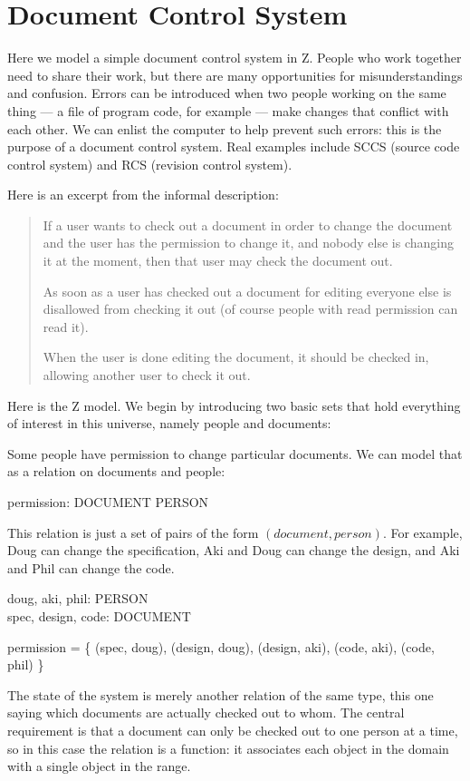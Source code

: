 \documentclass{article}
\begin{document}
\section*{Document Control System}

Here we model a simple document control system in Z.
People who work together need to share their work, but there are many
opportunities for misunderstandings and confusion.  Errors can be
introduced when two people working on the same thing --- a file of
program code, for example --- make changes that conflict with each
other.  We can enlist the computer to help prevent such errors: this
is the purpose of a document control system.  Real examples include
SCCS (source code control system) and RCS (revision control
system).

Here is an excerpt from the informal description:

\begin{quote}
    If a user wants to check out a document in order to change
    the document and the user  has the permission to change it, 
    and nobody else is changing it at the moment, then that user
    may check the document out.

    As soon as a user has checked out a document for editing
    everyone else is disallowed from checking it out (of course people with
    read permission can read it).

    When the user is done editing the document, it should be
    checked in, allowing another user to check it out.
\end{quote}

Here is the Z model.  We begin by introducing two basic sets that
hold everything of interest in this universe, namely people and
documents:

\begin{zed}  \end{zed}
Some people have permission to change particular documents.  We can model
that as a relation on documents and people:

\begin{axdef}
	permission: DOCUMENT \rel PERSON
\end{axdef}
This relation is just a set of pairs of the form $(document, person)$.
For example, Doug can change the specification, Aki and Doug can
change the design, and Aki and Phil can change the code.

\begin{axdef}
	doug, aki, phil: PERSON \\
	spec, design, code: DOCUMENT
\end{axdef}
\begin{zed}
	permission = \{ (spec, doug), (design, doug), (design, aki), (code, aki), (code, phil) \}
\end{zed}
The state of the system is merely another relation of the same type,
this one saying which documents are actually checked out to whom.   The
central requirement is that a document can only be checked out to
one person at a time, so in this case the relation is a function:
it associates each object in the domain with a single
object in the range.  
\end{document}
